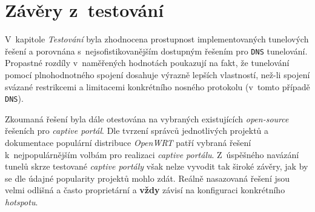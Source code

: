 \documentclass[thesis=M,czech]{FITthesis}[2012/10/20]
\begin{document}
\section{Závěry z~testování}

V~kapitole \textit{Testování} byla zhodnocena prostupnost implementovaných tunelových řešení a porovnána s~nejsofistikovanějším dostupným řešením pro \texttt{DNS} tunelování. Propastné rozdíly v~naměřených hodnotách poukazují na fakt, že tunelování pomocí plnohodnotného spojení dosahuje výrazně lepších vlastností, než-li spojení svázané restrikcemi a limitacemi konkrétního nosného protokolu (v~tomto případě \texttt{DNS}).

Zkoumaná řešení byla dále otestována na vybraných existujících \textit{open-source} řešeních pro \textit{captive portál}. Dle tvrzení správců jednotlivých projektů a dokumentace populární distribuce \textit{OpenWRT} patří vybraná řešení k~nejpopulárnějším volbám pro realizaci \textit{captive portálu}. Z~úspěšného navázání tunelů skrze testované \textit{captive portály} však nelze vyvodit tak široké závěry, jak by se dle údajné popularity projektů mohlo zdát. Reálně nasazovaná řešení jsou velmi odlišná a často proprietární a \textbf{vždy} závisí na konfiguraci konkrétního \textit{hotspotu}.

     
\end{document}
